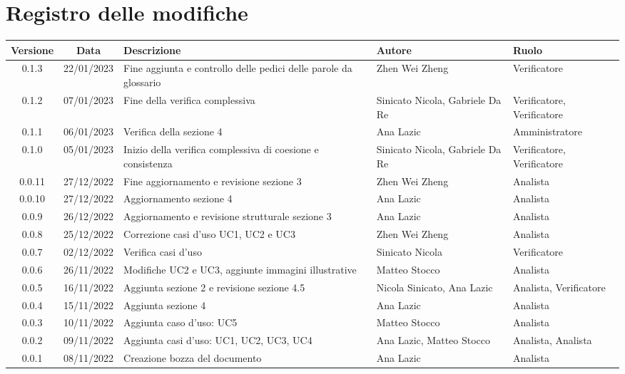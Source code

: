\section*{Registro delle modifiche}
\begin{center}
\renewcommand\tabularxcolumn[1]{>{\Centering}m{#1}}
\begin{tabularx}{\textwidth}{| c | c | X | X | X |} 
	\hline
	\textbf{Versione} & \textbf{Data} & \textbf{Descrizione} & \textbf{Autore} & \textbf{Ruolo}\\
	\hline
	0.1.3 & 22/01/2023 & Fine aggiunta e controllo delle pedici delle parole da glossario & Zhen Wei Zheng & Verificatore \\
	\hline
	0.1.2 & 07/01/2023 & Fine della verifica complessiva & Sinicato Nicola, Gabriele Da Re & Verificatore, Verificatore \\
	\hline
	0.1.1 & 06/01/2023 & Verifica della sezione 4 & Ana Lazic & Amministratore \\
	\hline
	0.1.0 & 05/01/2023 & Inizio della verifica complessiva di coesione e consistenza & Sinicato Nicola, Gabriele Da Re & Verificatore, Verificatore\\
	\hline
	0.0.11 & 27/12/2022 & Fine aggiornamento e revisione sezione 3 & Zhen Wei Zheng & Analista\\
    \hline
	0.0.10 & 27/12/2022 & Aggiornamento sezione 4 & Ana Lazic & Analista\\
    \hline
	0.0.9 & 26/12/2022 & Aggiornamento e revisione strutturale sezione 3 & Ana Lazic & Analista\\
	\hline
	0.0.8 & 25/12/2022 & Correzione casi d'uso UC1, UC2 e UC3 & Zhen Wei Zheng & Analista\\
	\hline
	0.0.7 & 02/12/2022 & Verifica casi d'uso & Sinicato Nicola & Verificatore\\
	\hline
	0.0.6 & 26/11/2022 & Modifiche UC2 e UC3, aggiunte immagini illustrative & Matteo Stocco & Analista\\
	\hline
	0.0.5 & 16/11/2022	 & Aggiunta sezione 2 e revisione sezione 4.5 & Nicola Sinicato, Ana Lazic & Analista, Verificatore\\
	\hline
	0.0.4 & 15/11/2022	 & Aggiunta sezione 4 & Ana Lazic & Analista\\
	\hline
	0.0.3 & 10/11/2022 & Aggiunta caso d’uso: UC5 & Matteo Stocco & Analista\\
	\hline
	0.0.2 & 09/11/2022	 & Aggiunta casi d’uso: UC1, UC2, UC3, UC4 & Ana Lazic, Matteo Stocco & Analista, Analista\\
	\hline
	0.0.1 & 08/11/2022 & Creazione bozza del documento & Ana Lazic & Analista\\
	\hline
\end{tabularx}		
\end{center}
